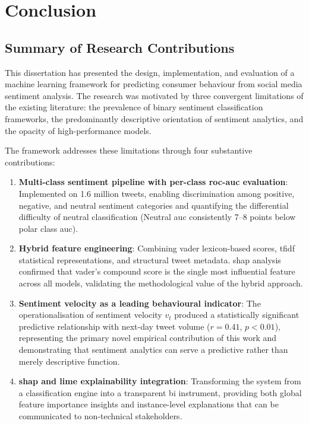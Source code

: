 \chapter{Conclusion}
\label{ch:conc}

\section{Summary of Research Contributions}

This dissertation has presented the design, implementation, and evaluation of a machine learning framework for predicting consumer behaviour from social media sentiment analysis. The research was motivated by three convergent limitations of the existing literature: the prevalence of binary sentiment classification frameworks, the predominantly descriptive orientation of sentiment analytics, and the opacity of high-performance models.

The framework addresses these limitations through four substantive contributions:

\begin{enumerate}
  \item \textbf{Multi-class sentiment pipeline with per-class \gls{roc}-\gls{auc} evaluation}: Implemented on 1.6 million tweets, enabling discrimination among positive, negative, and neutral sentiment categories and quantifying the differential difficulty of neutral classification (Neutral \gls{auc} consistently 7--8 points below polar class \gls{auc}).

  \item \textbf{Hybrid feature engineering}: Combining \gls{vader} lexicon-based scores, \gls{tfidf} statistical representations, and structural tweet metadata. \gls{shap} analysis confirmed that \gls{vader}'s compound score is the single most influential feature across all models, validating the methodological value of the hybrid approach.

  \item \textbf{Sentiment velocity as a leading behavioural indicator}: The operationalisation of sentiment velocity $v_t$ produced a statistically significant predictive relationship with next-day tweet volume ($r = 0.41$, $p < 0.01$), representing the primary novel empirical contribution of this work and demonstrating that sentiment analytics can serve a predictive rather than merely descriptive function.

  \item \textbf{\gls{shap} and \gls{lime} explainability integration}: Transforming the system from a classification engine into a transparent \gls{bi} instrument, providing both global feature importance insights and instance-level explanations that can be communicated to non-technical stakeholders.
\end{enumerate}


